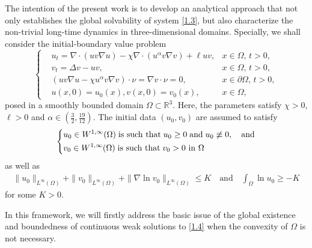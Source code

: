 \documentclass[12pt]{article}
\theoremstyle{plain}
\theoremstyle{definition}
\numberwithin{equation}{section}
\begin{document}
The intention of the present work  is to develop an analytical approach that not only establishes the global solvability of system \eqref{1.3}, but also characterize the non-trivial long-time dynamics in three-dimensional domains.
 Specially, we shall consider  the initial-boundary value  problem
\begin{equation}\label{1.4}
\left\{
\begin{aligned}
&u_{t}=\nabla \cdot (uv\nabla u)-\chi \nabla \cdot (u^{\alpha}v\nabla v)+\ell uv,&x\in \Omega,\, t>0,\\
& v_{t}=\Delta v-uv,&x\in \Omega,\, t>0,\\
&(uv\nabla u-\chi u^{\alpha}v\nabla v)\cdot \nu=\nabla v\cdot \nu=0,&x\in \partial\Omega,\, t>0,\\
&u(x,0)=u_0(x), v(x,0)=v_0(x), &x\in \Omega,
\end{aligned}
\right.
\end{equation}
posed in a smoothly bounded domain $\Omega\subset \mathbb{R}^3$. Here, the parameters satisfy    $\chi>0$,  $\ell>0$  and $\alpha \in
(\frac{3}{2},\frac{19}{12})$.
The initial data $(u_0,v_0)$ are assumed to satisfy
\begin{equation}\label{1.5}
\left\{
\begin{aligned}
&u_0\in W^{1,\infty}(\Omega)\; \hbox{is  such  that}\; u_0\geq 0\; \hbox{and}\; u_0\not\equiv0, \quad \text{and} \\
&v_0\in W^{1,\infty}(\Omega)\; \hbox{is  such  that}\; v_0>0\,\, \text{in} \,\,\Omega\\
\end{aligned}
\right.
\end{equation}
as well as
\begin{align}\label{1.6}
    \|u_0\|_{L^{\infty}(\Omega)}+\|v_0\|_{L^{\infty}(\Omega)}+\|\nabla \ln v_0\|_{L^{\infty}(\Omega)}\leq K\quad \text{and}\quad \int_{\Omega}\ln{u_0}\geq -K
\end{align}
for some $K>0$.

In this  framework, we will firstly address the basic issue of the global existence and
boundedness of continuous weak solutions to \eqref{1.4}  when  the convexity of $\Omega$ is not necessary.
\end{document}
